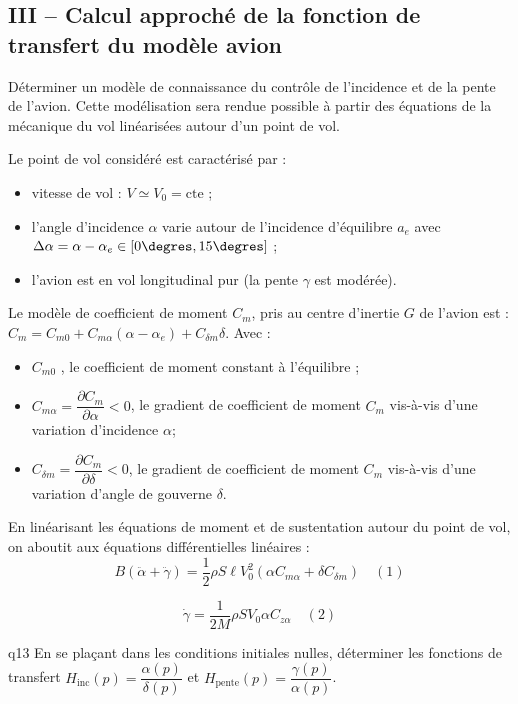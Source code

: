 \begin{multicols}{2}
  
\subsection*{III -- Calcul approché de la fonction de transfert du modèle avion}
  
  \begin{obj}
  Déterminer un modèle de connaissance du contrôle de l’incidence et de la pente de l’avion.
Cette modélisation sera rendue possible à partir des équations de la mécanique du vol
linéarisées autour d’un point de vol.
  \end{obj}
  
  Le point de vol considéré est caractérisé par :
\begin{itemize}
\item vitesse de vol : $V \simeq V_0 = \text{cte}$ ;
\item l’angle d’incidence $\alpha$ varie autour de l’incidence d’équilibre $a_e$ avec $\Delta \alpha = \alpha  - \alpha_e \in [0\degres, 15\degres]$ ;
\item l’avion est en vol longitudinal pur (la pente $\gamma$ est modérée).
\end{itemize}

Le modèle de coefficient de moment $C_m$, pris au centre d’inertie $G$ de l’avion est :
$C_m = C_{m0} + C_{m\alpha} (\alpha - \alpha_e) + C_{\delta m}\delta$.
Avec :
\begin{itemize}
\item $C_{m0}$ , le coefficient de moment constant à l’équilibre ;
\item $C_{m\alpha} = \dfrac{\partial C_m}{\partial \alpha} < 0$, le gradient de coefficient de moment $C_m$ vis-à-vis d’une variation d’incidence $\alpha$;
\item $C_{\delta m} = \dfrac{\partial C_m}{\partial \delta} < 0$, le gradient de coefficient de moment $C_m$ vis-à-vis d’une variation d’angle de gouverne $\delta$.
\end{itemize}
En linéarisant les équations de moment et de sustentation autour du point de vol, on aboutit aux équations différentielles linéaires :
$$
B\left(\ddot{\alpha}+\ddot{\gamma}\right)=\dfrac{1}{2}\rho S \ell V_0^2 \left(\alpha C_{m\alpha} + \delta C_{\delta m} \right)\quad (1)
$$

$$
\dot{\gamma} = \dfrac{1}{2M} \rho S V_0 \alpha C_{z \alpha} \quad (2)
$$


{\begin{question}{q13}
En se plaçant dans les conditions initiales nulles, déterminer les fonctions de transfert $H_{\text{inc}}(p)=\dfrac{\alpha(p)}{\delta(p)}$ et $H_{\text{pente}}(p)=\dfrac{\gamma(p)}{\alpha(p)}$.


\end{question}}
\end{multicols}
